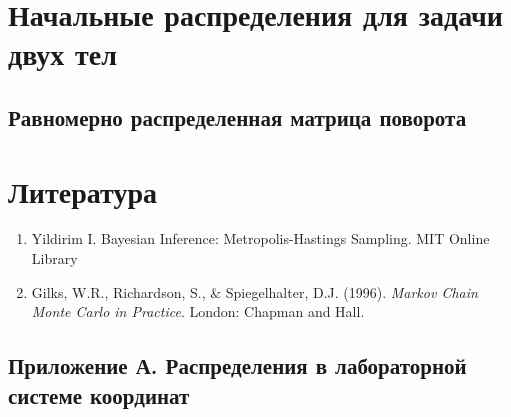 \documentclass[12pt]{article}
\begin{document}
\section{Начальные распределения для задачи двух тел}



\subsection{Равномерно распределенная матрица поворота}



\newpage
\section{Литература}
\begin{enumerate}
	\item Yildirim I. Bayesian Inference: Metropolis-Hastings Sampling. MIT Online Library
	\item Gilks, W.R., Richardson, S., \& Spiegelhalter, D.J. (1996). \textit{Markov Chain Monte Carlo in Practice}. London: Chapman and Hall.
\end{enumerate}

\newpage


\begin{appendices}
\section{Приложение А. Распределения в лабораторной системе координат} \label{app1}



\end{appendices}
\end{document}
